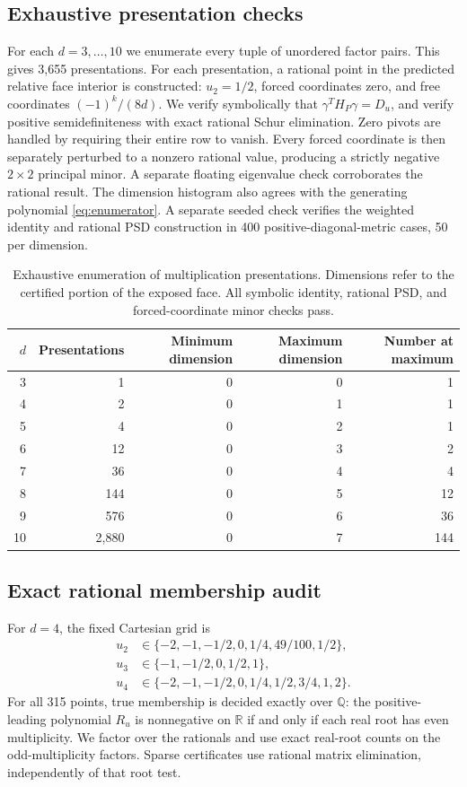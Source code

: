 \documentclass[11pt]{article}
\theoremstyle{definition}\newtheorem{definition}[theorem]{Definition}
\theoremstyle{remark}\newtheorem{remark}[theorem]{Remark}
\newcommand{\R}{\mathbb{R}}
\begin{document}
\subsection{Exhaustive presentation checks}
For each $d=3,\ldots,10$ we enumerate every tuple of unordered factor pairs. This gives 3,655 presentations. For each presentation, a rational point in the predicted relative face interior is constructed: $u_2=1/2$, forced coordinates zero, and free coordinates $(-1)^k/(8d)$. We verify symbolically that $\gamma^TH_P\gamma=D_u$, and verify positive semidefiniteness with exact rational Schur elimination. Zero pivots are handled by requiring their entire row to vanish. Every forced coordinate is then separately perturbed to a nonzero rational value, producing a strictly negative $2\times2$ principal minor. A separate floating eigenvalue check corroborates the rational result. The dimension histogram also agrees with the generating polynomial \eqref{eq:enumerator}. A separate seeded check verifies the weighted identity and rational PSD construction in 400 positive-diagonal-metric cases, 50 per dimension.

\begin{table}[t]
\centering
\begin{tabular}{rrrrr}
\toprule
$d$ & Presentations & Minimum dimension & Maximum dimension & Number at maximum\\\midrule
3&1&0&0&1\\
4&2&0&1&1\\
5&4&0&2&1\\
6&12&0&3&2\\
7&36&0&4&4\\
8&144&0&5&12\\
9&576&0&6&36\\
10&2,880&0&7&144\\\bottomrule
\end{tabular}
\caption{Exhaustive enumeration of multiplication presentations. Dimensions refer to the certified portion of the exposed face. All symbolic identity, rational PSD, and forced-coordinate minor checks pass.}\label{tab:enumeration}
\end{table}

\subsection{Exact rational membership audit}
For $d=4$, the fixed Cartesian grid is
\begin{align*}
 u_2&\in\{-2,-1,-1/2,0,1/4,49/100,1/2\},\\
 u_3&\in\{-1,-1/2,0,1/2,1\},\\
 u_4&\in\{-2,-1,-1/2,0,1/4,1/2,3/4,1,2\}.
\end{align*}
For all 315 points, true membership is decided exactly over $\mathbb{Q}$: the positive-leading polynomial $R_u$ is nonnegative on $\R$ if and only if each real root has even multiplicity. We factor over the rationals and use exact real-root counts on the odd-multiplicity factors. Sparse certificates use rational matrix elimination, independently of that root test.
\end{document}
